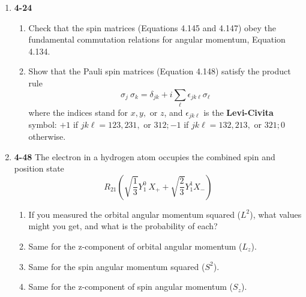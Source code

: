 \documentclass[fleqn]{article}
\begin{document}
  \begin{enumerate}
    \item \textbf{4-24}
    \begin{enumerate}
      \item Check that the spin matrices (Equations 4.145 and 4.147) obey the fundamental commutation relations for angular momentum, Equation 4.134.


      \item Show that the Pauli spin matrices (Equation 4.148) satisfy the product rule 
      $$
        \sigma_j ~ \sigma_k=\delta_{jk}+i \sum\limits_{\ell} \epsilon_{jk \ell} \sigma_{\ell}
      $$
      where the indices stand for $x, y,$ or $z$, and $\epsilon_{jk \ell}$ is the \textbf{Levi-Civita} symbol: $+1$ if 
      $jk \ell=123, 231,$ or $312; -1$ if $jk \ell=132, 213,$ or $321; 0$ otherwise.


    \end{enumerate}

    \item \textbf{4-48} The electron in a hydrogen atom occupies the combined spin and position state
    $$
      R_{21} \left(
        \sqrt{\dfrac{1}{3}} Y_1^0 ~ X_+ +\sqrt{\dfrac{2}{3}} Y_1^1 X_-
      \right)
    $$
    \begin{enumerate}
      \item If you measured the orbital angular momentum squared ($L^2$), what values might you get,
      and what is the probability of each?


      \item Same for the z-component of orbital angular momentum ($L_z$).


      \item Same for the spin angular momentum squared ($S^2$).


      \item Same for the z-component of spin angular momentum ($S_z$).


    \end{enumerate}
    

  \end{enumerate}
\end{document}
